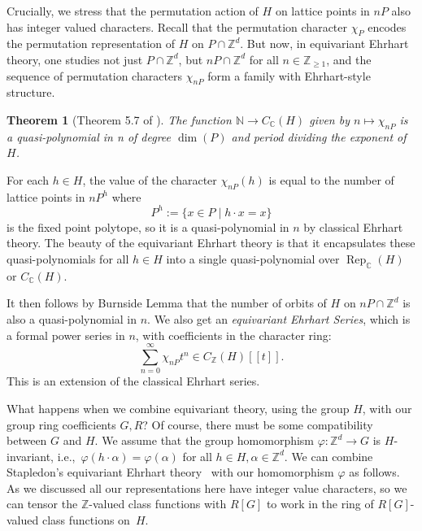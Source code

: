 \documentclass[12pt,reqno]{amsart}
\newtheorem{thm}{Theorem}[section]
\theoremstyle{definition}
\theoremstyle{remark}
\newcommand{\C}{\mathbb{C}}
\newcommand{\N}{\mathbb{N}}
\newcommand{\Z}{\mathbb{Z}}
\begin{document}
Crucially, we stress that the permutation action of $H$ on lattice points in $nP$ also has integer valued characters.
Recall that the permutation character $\chi_P$ encodes the permutation representation of $H$ on $P \cap \Z^d$. But now, in equivariant Ehrhart theory, one studies not just $P \cap \Z^d$, but $nP \cap \Z^d$ for all $n \in \mathbb{Z}_{\geq 1}$, and the sequence of permutation characters $\chi_{nP}$ form a family with Ehrhart-style structure. 

\begin{thm}[Theorem 5.7 of \cite{StapledonEquivariant}]
The function $\N \rightarrow C_\C(H)$ given by $n \mapsto \chi_{nP}$ is a quasi-polynomial in n of degree $\dim(P)$ and period dividing the exponent of $H$. 
\end{thm}
For each $h \in H$, the value of the character $\chi_{nP}(h)$ is equal to the number of lattice points in $n P^h$ where \[P^h := \{ x \in P \mid h \cdot x = x \}\]  is the fixed point polytope, so it is a quasi-polynomial in $n$ by  classical Ehrhart theory.  The beauty of the equivariant Ehrhart theory is that it encapsulates these quasi-polynomials for all $h\in H$ into a single quasi-polynomial over $\mathop{Rep}_\C(H)$ or $C_\C(H)$.

It then follows by Burnside Lemma that the number of orbits of $H$ on $nP \cap \Z^d$ is also a quasi-polynomial in $n$. 
We also get an \emph{equivariant Ehrhart Series}, which is a formal power series in $n$, with coefficients in the character ring:
 $$\sum_{n=0}^\infty \chi_{nP} t^n \in C_\Z(H)[[t]].$$
This is an extension of the classical Ehrhart series.

What happens when we combine equivariant theory, using the group $H$, with our group ring  coefficients $G,R$? Of course, there must be some compatibility between $G$ and $H$. We assume that the group homomorphism $\varphi : \Z^d \rightarrow G$ is $H$-invariant, i.e.,\ $\varphi(h\cdot \alpha) = \varphi(\alpha)$ for all $h \in H, \alpha \in \Z^d$.
We can combine Stapledon's equivariant Ehrhart theory~\cite{StapledonEquivariant} with our homomorphism $\varphi$ as follows. 
As we discussed
all our representations here have integer value characters, so we can tensor the $\Z$-valued class functions with $R[G]$ to work in the ring of $R[G]$-valued class functions on~$H$.
\end{document}
